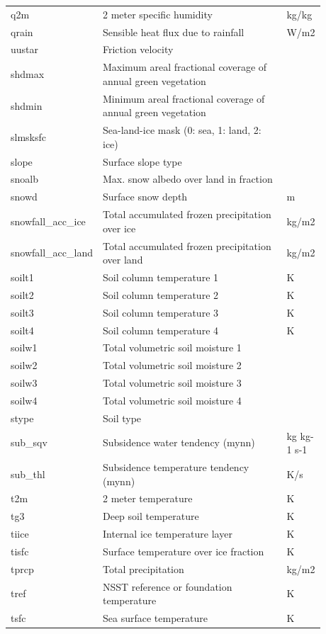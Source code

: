 \documentclass[11pt,fleqn]{report}              %
\begin{document}
\begin{enumerate}
\begin{enumerate}
{\begin{longtable}{p{0.17\linewidth} | p{0.6\linewidth} | p{0.11\linewidth} }
q2m  & 2 meter specific humidity & kg/kg \\
qrain  & Sensible heat flux due to rainfall & W/m2 \\
uustar  & Friction velocity & \\
shdmax  & Maximum areal fractional coverage of annual green vegetation  & \\
shdmin  & Minimum areal fractional coverage of annual green vegetation  & \\
slmsksfc  & Sea-land-ice mask (0: sea, 1: land, 2: ice) & \\
slope  & Surface slope type & \\
snoalb  & Max. snow albedo over land in fraction & \\
snowd  & Surface snow depth & m \\
snowfall\_acc\_ice  & Total accumulated frozen precipitation over ice & kg/m2 \\
snowfall\_acc\_land  & Total accumulated frozen precipitation over land & kg/m2 \\
soilt1  & Soil column temperature 1 & K \\
soilt2  & Soil column temperature 2 & K \\
soilt3  & Soil column temperature 3 & K \\
soilt4  & Soil column temperature 4 & K \\
soilw1  & Total volumetric soil moisture 1 & \\
soilw2  & Total volumetric soil moisture 2 & \\
soilw3  & Total volumetric soil moisture 3 & \\
soilw4  & Total volumetric soil moisture 4 & \\
stype  & Soil type & \\
sub\_sqv & Subsidence water tendency (mynn) & kg kg-1 s-1 \\
sub\_thl & Subsidence temperature tendency (mynn) & K/s \\
t2m  & 2 meter temperature  & K \\
tg3  & Deep soil temperature & K \\
tiice & Internal ice temperature layer & K \\
tisfc  & Surface temperature over ice fraction & K  \\ 
tprcp  & Total precipitation  & kg/m2 \\
tref  & NSST reference or foundation temperature & K  \\
tsfc  & Sea surface temperature & K \\

\end{longtable}}
\end{enumerate}
\end{enumerate}
\end{document}
